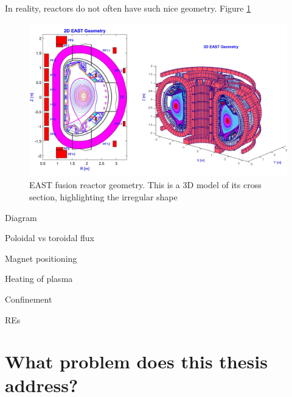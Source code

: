 In reality, reactors do not often have such nice geometry. Figure \ref{fig:east-geometry}
\begin{figure}[h!]
    \centering
    \includegraphics[scale=0.2]{imgs/c1/east-cross-section.png}
    \caption{EAST fusion reactor geometry. This is a 3D model of its cross section, highlighting the irregular shape \cite{east-geometry-article}}
    \label{fig:east-geometry}
\end{figure}

Diagram

Poloidal vs toroidal flux

Magnet positioning

Heating of plasma

Confinement

REs

\section{What problem does this thesis address?}

